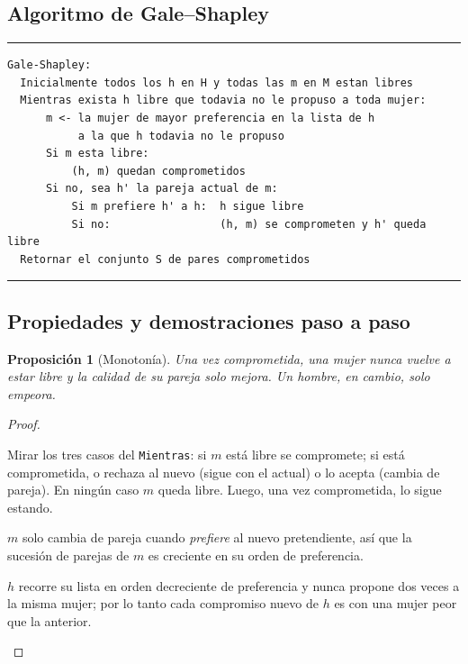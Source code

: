 \documentclass[11pt,a4paper]{article}
\theoremstyle{plain}
\newtheorem{proposicion}[teorema]{Proposición}
\theoremstyle{definition}
\theoremstyle{remark}
\newcommand{\codigoinicio}{\begin{center}\begin{minipage}{0.93\textwidth}%
  \hrule\vspace{3pt}}
\newcommand{\codigofin}{\vspace{-4pt}\hrule\end{minipage}\end{center}}
\begin{document}
\subsection{Algoritmo de Gale--Shapley}

\codigoinicio
\begin{verbatim}
Gale-Shapley:
  Inicialmente todos los h en H y todas las m en M estan libres
  Mientras exista h libre que todavia no le propuso a toda mujer:
      m <- la mujer de mayor preferencia en la lista de h
           a la que h todavia no le propuso
      Si m esta libre:
          (h, m) quedan comprometidos
      Si no, sea h' la pareja actual de m:
          Si m prefiere h' a h:  h sigue libre
          Si no:                 (h, m) se comprometen y h' queda libre
  Retornar el conjunto S de pares comprometidos
\end{verbatim}
\codigofin

\subsection{Propiedades y demostraciones paso a paso}

\begin{proposicion}[Monotonía]\label{p:gs-mono}
Una vez comprometida, una mujer nunca vuelve a estar libre y la calidad de su pareja
solo \emph{mejora}. Un hombre, en cambio, solo \emph{empeora}.
\end{proposicion}
\begin{proof}
\begin{pasos}
\item Mirar los tres casos del \texttt{Mientras}: si $m$ está libre se compromete; si
está comprometida, o rechaza al nuevo (sigue con el actual) o lo acepta (cambia de
pareja). En ningún caso $m$ queda libre. Luego, una vez comprometida, lo sigue estando.
\item $m$ solo cambia de pareja cuando \emph{prefiere} al nuevo pretendiente, así que la
sucesión de parejas de $m$ es creciente en su orden de preferencia.
\item $h$ recorre su lista en orden decreciente de preferencia y nunca propone dos veces
a la misma mujer; por lo tanto cada compromiso nuevo de $h$ es con una mujer peor que la
anterior. \qedhere
\end{pasos}
\end{proof}
\end{document}
